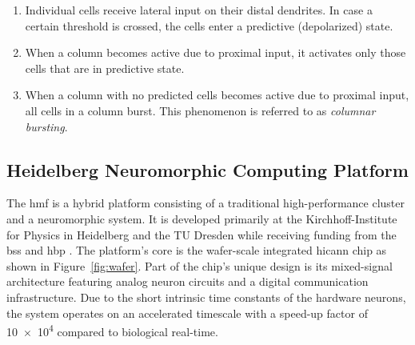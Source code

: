 \begin{enumerate}

	\item Individual cells receive lateral input on their distal dendrites. In
	case a certain threshold is crossed, the cells enter a predictive
	(depolarized) state.

	\item\label{enm:temporal_memory_predictive} When a column becomes active due
	to proximal input, it activates only those cells that are in predictive state.

	\item\label{enm:temporal_memory_bursting} When a column with no predicted
	cells becomes active due to proximal input, all cells in a column burst. This
	phenomenon is referred to as \emph{columnar bursting}.

\end{enumerate}

\subsection{Heidelberg Neuromorphic Computing Platform}

The \gls{hmf} is a hybrid platform consisting of a traditional high-performance
cluster and a neuromorphic system. It is developed primarily at the
Kirchhoff-Institute for Physics in Heidelberg and the TU Dresden while receiving
funding from the \gls{bss} and \gls{hbp} \citep{hbp2014sp9spec}. The platform's
core is the wafer-scale integrated \gls{hicann} chip as shown in
Figure~\ref{fig:wafer}. Part of the chip's unique design is its mixed-signal
architecture featuring analog neuron circuits and a digital communication
infrastructure. Due to the short intrinsic time constants of the hardware
neurons, the system operates on an accelerated timescale with a speed-up factor
of \num{10e4} compared to biological real-time.

